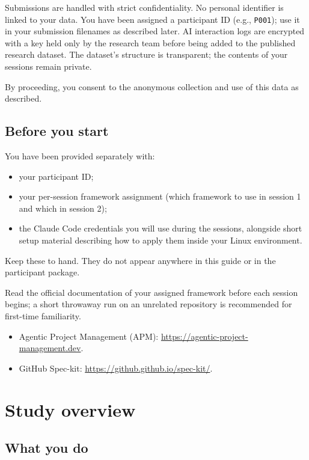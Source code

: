\documentclass[11pt, a4paper]{article}
\begin{document}
Submissions are handled with strict confidentiality. No personal identifier is linked to your data. You have been assigned a participant ID (e.g., \texttt{P001}); use it in your submission filenames as described later. AI interaction logs are encrypted with a key held only by the research team before being added to the published research dataset. The dataset's structure is transparent; the contents of your sessions remain private.

By proceeding, you consent to the anonymous collection and use of this data as described.

\subsection{Before you start}
\label{sec:beforestart}

You have been provided separately with:

\begin{itemize}
    \item your participant ID;
    \item your per-session framework assignment (which framework to use in session 1 and which in session 2);
    \item the Claude Code credentials you will use during the sessions, alongside short setup material describing how to apply them inside your Linux environment.
\end{itemize}

Keep these to hand. They do not appear anywhere in this guide or in the participant package.

Read the official documentation of your assigned framework before each session begins; a short throwaway run on an unrelated repository is recommended for first-time familiarity.

\begin{itemize}
    \item Agentic Project Management (APM): \url{https://agentic-project-management.dev}.
    \item GitHub Spec-kit: \url{https://github.github.io/spec-kit/}.
\end{itemize}

\section{Study overview}
\label{sec:overview}

\subsection{What you do}
\label{sec:whatyoudo}
\end{document}
